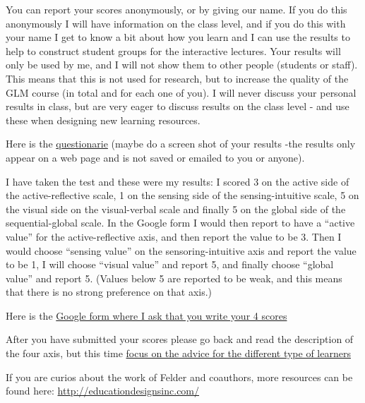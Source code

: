 \documentclass[
  ignorenonframetext,
]{beamer}
\begin{document}
\begin{frame}
You can report your scores anonymously, or by giving our name. If you do
this anonymously I will have information on the class level, and if you
do this with your name I get to know a bit about how you learn and I can
use the results to help to construct student groups for the interactive
lectures. Your results will only be used by me, and I will not show them
to other people (students or staff). This means that this is not used
for research, but to increase the quality of the GLM course (in total
and for each one of you). I will never discuss your personal results in
class, but are very eager to discuss results on the class level - and
use these when designing new learning resources.

Here is the
\href{https://www.webtools.ncsu.edu/learningstyles/}{questionarie}
(maybe do a screen shot of your results -the results only appear on a
web page and is not saved or emailed to you or anyone).

I have taken the test and these were my results: I scored 3 on the
active side of the active-reflective scale, 1 on the sensing side of the
sensing-intuitive scale, 5 on the visual side on the visual-verbal scale
and finally 5 on the global side of the sequential-global scale. In the
Google form I would then report to have a ``active value'' for the
active-reflective axis, and then report the value to be 3. Then I would
choose ``sensing value'' on the sensoring-intuitive axis and report the
value to be 1, I will choose ``visual value'' and report 5, and finally
choose ``global value'' and report 5. (Values below 5 are reported to be
weak, and this means that there is no strong preference on that axis.)

Here is the \href{https://goo.gl/forms/p77EFhQabe9BIZT32}{Google form
where I ask that you write your 4 scores}

After you have submitted your scores please go back and read the
description of the four axis, but this time
\href{http://www4.ncsu.edu/unity/lockers/users/f/felder/public//ILSdir/styles.pdf}{focus
on the advice for the different type of learners}

If you are curios about the work of Felder and coauthors, more resources
can be found here: \url{http://educationdesignsinc.com/}
\end{frame}
\end{document}
